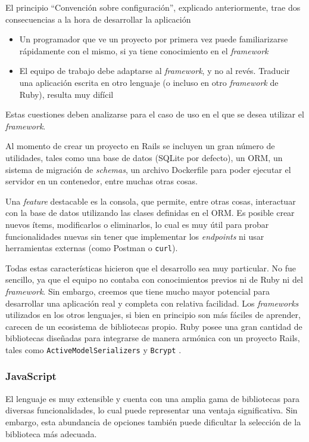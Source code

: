 \documentclass[11pt]{article}
\let\Oldsubsubsection\subsubsection
\renewcommand{\subsubsection}{\FloatBarrier\Oldsubsubsection}
\newcommand{\english}[1]{\textit{#1}}
\begin{document}
El principio ``Convención sobre configuración'', explicado anteriormente, trae dos consecuencias a la hora de desarrollar la aplicación
\begin{itemize}
    \item Un programador que ve un proyecto por primera vez puede familiarizarse rápidamente con el mismo, si ya tiene conocimiento en el \english{framework}
    \item El equipo de trabajo debe adaptarse al \english{framework}, y no al revés. Traducir una aplicación escrita en otro lenguaje (o incluso en otro \english{framework} de Ruby), resulta muy difícil
\end{itemize}
Estas cuestiones deben analizarse para el caso de uso en el que se desea utilizar el \english{framework}.

Al momento de crear un proyecto en Rails se incluyen un gran número de utilidades, tales como una base de datos (SQLite por defecto), un ORM, un sistema de migración de \english{schemas}, un archivo Dockerfile para poder ejecutar el servidor en un contenedor, entre muchas otras cosas.

Una \english{feature} destacable es la consola, que permite, entre otras cosas, interactuar con la base de datos utilizando las clases definidas en el ORM. Es posible crear nuevos ítems, modificarlos o eliminarlos, lo cual es muy útil para probar funcionalidades nuevas sin tener que implementar los \english{endpoints} ni usar herramientas externas (como Postman o \lstinline{curl}).

Todas estas características hicieron que el desarrollo sea muy particular. No fue sencillo, ya que el equipo no contaba con conocimientos previos ni de Ruby ni del \english{framework}. Sin embargo, creemos que tiene mucho mayor potencial para desarrollar una aplicación real y completa con relativa facilidad. Los \english{frameworks} utilizados en los otros lenguajes, si bien en principio son más fáciles de aprender, carecen de un ecosistema de bibliotecas propio. Ruby posee una gran cantidad de bibliotecas diseñadas para integrarse de manera armónica con un proyecto Rails, tales como \lstinline{ActiveModelSerializers} \cite{http:ruby:active_model_serializer} y \lstinline{Bcrypt} \cite{http:ruby:bcrypt}.

\subsubsection{JavaScript}

El lenguaje es muy extensible y cuenta con una amplia gama de bibliotecas para diversas funcionalidades, lo cual puede representar una ventaja significativa. Sin embargo, esta abundancia de opciones también puede dificultar la selección de la biblioteca más adecuada.
\end{document}
